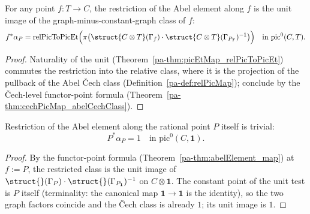 \begin{theorem}
  \label{pa-thm:abelElement_map}
  \leanok

  For any point \(f \colon T \to C\), the restriction of the Abel element along \(f\) is the
  unit image of the graph-minus-constant-graph class of \(f\):
  \[
    f^{*}\alpha_P = \mathrm{relPicToPicEt}\Bigl(\pi\bigl(
      \struct{C \otimes T}(\Gamma_f)\cdot\struct{C\otimes T}(\Gamma_{P_T})^{-1}\bigr)\Bigr)
    \quad\text{in } \mathrm{pic}^0(C,T).
  \]
\end{theorem}
\begin{proof}
  \leanok
  Naturality of the unit (Theorem~\ref{pa-thm:picEtMap_relPicToPicEt}) commutes the restriction
  into the relative class, where it is the projection of the pullback of the Abel \v Cech
  class (Definition~\ref{pa-def:relPicMap}); conclude by the \v Cech-level functor-point
  formula (Theorem~\ref{pa-thm:cechPicMap_abelCechClass}).
\end{proof}

\begin{theorem}
  \label{pa-thm:abelElement_map_point}
  \leanok

  Restriction of the Abel element along the rational point \(P\) itself is trivial:
  \[
    P^{*} \alpha_P = 1 \quad\text{in } \mathrm{pic}^0(C, \mathbf 1).
  \]
\end{theorem}
\begin{proof}
  \leanok
  By the functor-point formula (Theorem~\ref{pa-thm:abelElement_map}) at \(f := P\), the
  restricted class is the unit image of
  \(\struct{}(\Gamma_P)\cdot\struct{}(\Gamma_{P_{\mathbf 1}})^{-1}\) on
  \(C \otimes \mathbf 1\). The constant point of the unit test is \(P\) itself
  (terminality: the canonical map \(\mathbf 1 \to \mathbf 1\) is the identity), so the two
  graph factors coincide and the \v Cech class is already \(1\); its unit image is \(1\).
\end{proof}
